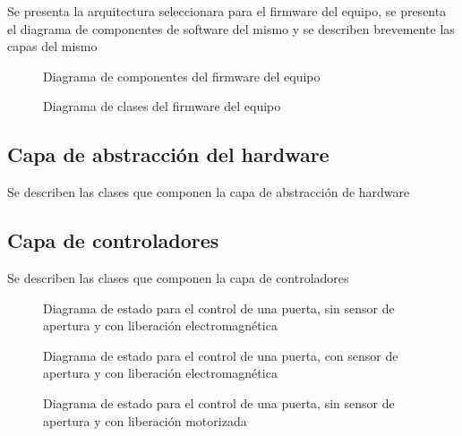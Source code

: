 Se presenta la arquitectura seleccionara para el firmware del equipo, se presenta el diagrama de componentes de software del mismo y se describen brevemente las capas del mismo

\begin{figure}[ht]
	\centering
	\caption{Diagrama de componentes del firmware del equipo}
	\label{fig:DiagramaComponentes}
\end{figure}

\begin{figure}[ht]
	\centering
	\caption{Diagrama de clases del firmware del equipo}
	\label{fig:DiagramaClases}
\end{figure}

\subsection{Capa de abstracción del hardware}

Se describen las clases que componen la capa de abstracción de hardware

\subsection{Capa de controladores}

Se describen las clases que componen la capa de controladores

\begin{figure}[ht]
	\centering
	\caption{Diagrama de estado para el control de una puerta, sin sensor de apertura y con liberación electromagnética}
	\label{fig:ControlSinSin}
\end{figure}

\begin{figure}[ht]
	\centering
	\caption{Diagrama de estado para el control de una puerta, con sensor de apertura y con liberación electromagnética}
	\label{fig:ControlSinCon}
\end{figure}

\begin{figure}[ht]
	\centering
	\caption{Diagrama de estado para el control de una puerta, sin sensor de apertura y con liberación motorizada}
	\label{fig:ControlConSin}
\end{figure}

